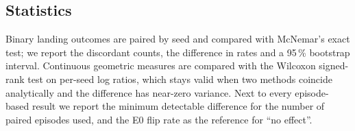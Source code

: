 \subsection{Statistics}\label{sec:stats}
Binary landing outcomes are paired by seed and compared with McNemar's exact test; we report the discordant counts, the difference in rates and a 95\,\% bootstrap interval. Continuous geometric measures are compared with the Wilcoxon signed-rank test on per-seed log ratios, which stays valid when two methods coincide analytically and the difference has near-zero variance. Next to every episode-based result we report the minimum detectable difference for the number of paired episodes used, and the E0 flip rate as the reference for ``no effect''. 
